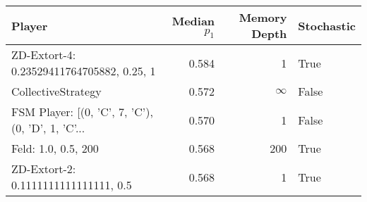 \begin{tabular}{lrrl}
\toprule
                                            Player &  Median $p_1$ &  Memory Depth & Stochastic \\
\midrule
         ZD-Extort-4: 0.23529411764705882, 0.25, 1 &         0.584 &             1 &       True \\
                                CollectiveStrategy &         0.572 &            \(\infty\) &      False \\
 FSM Player: [(0, 'C', 7, 'C'), (0, 'D', 1, 'C'... &         0.570 &             1 &      False \\
                               Feld: 1.0, 0.5, 200 &         0.568 &           200 &       True \\
              ZD-Extort-2: 0.1111111111111111, 0.5 &         0.568 &             1 &       True \\
\bottomrule
\end{tabular}
